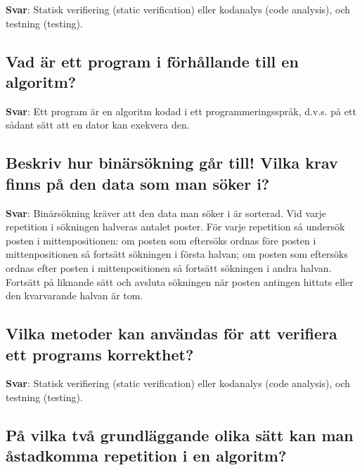 \documentclass[a4paper,11pt,oneside]{article}
\begin{document}
\begin{sloppypar}
\label{q:178:sa:sv:True}

\textbf{Svar}: Statisk verifiering (static verification) eller kodanalys (code analysis), och testning (testing).



\subsection{Vad \"ar ett program i f\"orh\r{a}llande till en algoritm?}

\label{q:179:sa:sv:True}

\textbf{Svar}: Ett program \"ar en algoritm kodad i ett programmeringsspr\r{a}k, d.v.s. p\r{a} ett s\r{a}dant s\"att att en dator kan exekvera den.



\subsection{Beskriv hur bin\"ars\"okning g\r{a}r till! Vilka krav finns p\r{a} den data som man s\"oker i?}

\label{q:180:sa:sv:True}

\textbf{Svar}: Bin\"ars\"okning kr\"aver att den data man s\"oker i \"ar sorterad. Vid varje repetition i s\"okningen halveras antalet poster. F\"or varje repetition s\r{a} unders\"ok posten i mittenpositionen: om posten som efters\"oks ordnas f\"ore posten i mittenpositionen s\r{a} forts\"att s\"okningen i f\"orsta halvan; om posten som efters\"oks ordnas efter posten i mittenpositionen s\r{a} forts\"att s\"okningen i andra halvan. Forts\"att p\r{a} liknande s\"att och avsluta s\"okningen n\"ar posten antingen hittats eller den kvarvarande halvan \"ar tom.



\subsection{Vilka metoder kan anv\"andas f\"or att verifiera ett programs korrekthet?}

\label{q:181:sa:sv:True}

\textbf{Svar}: Statisk verifiering (static verification) eller kodanalys (code analysis), och testning (testing).



\subsection{P\r{a} vilka tv\r{a} grundl\"aggande olika s\"att kan man \r{a}stadkomma repetition i en algoritm?}


\end{sloppypar}
\end{document}
